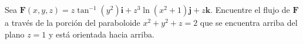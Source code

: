 \item Sea $\mathbf{F}(x, y, z) = z \tan^{-1}(y^2)\mathbf{i} + z^3 \ln(x^2 + 1)\mathbf{j} + z\mathbf{k}$. Encuentre el flujo de $\mathbf{F}$ a través de la porción del paraboloide $x^2 + y^2 + z = 2$ que se encuentra arriba del plano $z = 1$ y está orientada hacia arriba.
